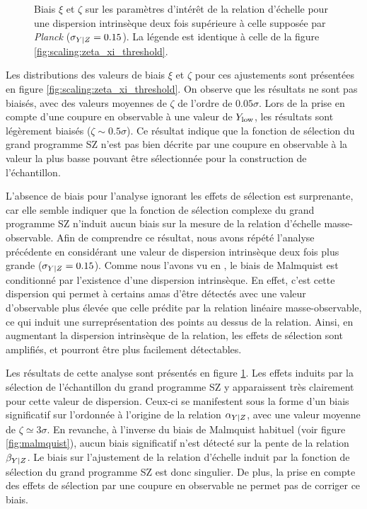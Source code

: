 \begin{figure}[t]
    \caption{
        Biais $\xi$ et $\zeta$ sur les paramètres d'intérêt de la relation d'échelle pour une dispersion intrinsèque deux fois supérieure à celle supposée par \textit{Planck} ($\sigma_{Y|Z} = 0.15$).
        La légende est identique à celle de la figure \ref{fig:scaling:zeta_xi_threshold}.
    }
    \label{fig:scaling:zeta_xi_threshold_2}
\end{figure}

Les distributions des valeurs de biais $\xi$ et $\zeta$ pour ces ajustements sont présentées en figure \ref{fig:scaling:zeta_xi_threshold}.
On observe que les résultats ne sont pas biaisés, avec des valeurs moyennes de $\zeta$ de l'ordre de $0.05\sigma$.
Lors de la prise en compte d'une coupure en observable à une valeur de $Y_{\rm low}$, les résultats sont légèrement biaisés ($\zeta \sim 0.5\sigma$).
Ce résultat indique que la fonction de sélection du grand programme SZ n'est pas bien décrite par une coupure en observable à la valeur la plus basse pouvant être sélectionnée pour la construction de l'échantillon.

L'absence de biais pour l'analyse ignorant les effets de sélection est surprenante, car elle semble indiquer que la fonction de sélection complexe du grand programme SZ n'induit aucun biais sur la mesure de la relation d'échelle masse-observable.
Afin de comprendre ce résultat, nous avons répété l'analyse précédente en considérant une valeur de dispersion intrinsèque deux fois plus grande ($\sigma_{Y|Z} = 0.15$).
Comme nous l'avons vu en , le biais de Malmquist est conditionné par l'existence d'une dispersion intrinsèque.
En effet, c'est cette dispersion qui permet à certains amas d'être détectés avec une valeur d'observable plus élevée que celle prédite par la relation linéaire masse-observable, ce qui induit une surreprésentation des points au dessus de la relation.
Ainsi, en augmentant la dispersion intrinsèque de la relation, les effets de sélection sont amplifiés, et pourront être plus facilement détectables.

Les résultats de cette analyse sont présentés en figure \ref{fig:scaling:zeta_xi_threshold_2}.
Les effets induits par la sélection de l'échantillon du grand programme SZ y apparaissent très clairement pour cette valeur de dispersion.
Ceux-ci se manifestent sous la forme d'un biais significatif sur l'ordonnée à l'origine de la relation $\alpha_{Y|Z}$, avec une valeur moyenne de $\zeta \simeq 3\sigma$.
En revanche, à l'inverse du biais de Malmquist habituel (voir figure \ref{fig:malmquist}), aucun biais significatif n'est détecté sur la pente de la relation $\beta_{Y|Z}$.
Le biais sur l'ajustement de la relation d'échelle induit par la fonction de sélection du grand programme SZ est donc singulier.
De plus, la prise en compte des effets de sélection par une coupure en observable ne permet pas de corriger ce biais.

